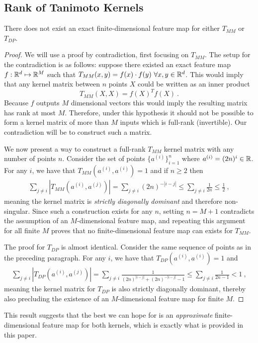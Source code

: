 \subsection{Rank of Tanimoto Kernels}\label{apdx:proof-of-kernel-rank}

\begin{lemma}
    There does not exist an exact finite-dimensional feature map for either $T_{MM}$ or $T_{DP}$.
\end{lemma}
\begin{proof}
    We will use a proof by contradiction, first focusing on $T_{MM}$.
    The setup for the contradiction is as follows: suppose there existed an exact feature map
    $f:\mathbb{R}^d\mapsto\mathbb{R}^M$
    such that $T_{MM}(x,y)=f(x)\cdot f(y)\ \forall x,y\in\mathbb{R}^d$.
    This would imply that any kernel matrix between $n$ points $X$
    could be written as an inner product
    \begin{equation*}
        T_{MM}(X,X)=f(X)^T f(X) \ .
    \end{equation*}
    Because $f$ outputs $M$ dimensional vectors this would imply the resulting matrix has rank at most $M$.
    Therefore, under this hypothesis it should not be possible to form a kernel matrix of more than $M$ inputs which is full-rank (invertible). Our contradiction will be to construct such a matrix.

    We now present a way to construct a full-rank $T_{MM}$ kernel matrix with any number of points $n$.
    Consider the set of points $\{a^{(i)}\}_{i=1}^n$ where $a^{(i)}= (2n)^i \in \mathbb{R}$.
    For any $i$, we have that $T_{MM}(a^{(i)}, a^{(i)})=1$
    and if $n\geq 2$ then
    \begin{align*}
        \sum_{j\neq i} | T_{MM}(a^{(i)}, a^{(j)}) | = \sum_{j\neq i} (2n)^{-|i-j|} \leq \sum_{j\neq i} \frac{1}{2n} \leq \frac{1}{2}\ ,
    \end{align*}
    meaning the kernel matrix is \emph{strictly diagonally dominant} and therefore non-singular.
    Since such a construction exists for any $n$,
    setting $n=M+1$ contradicts the assumption of an $M$-dimensional feature map, and repeating this argument for all finite $M$ proves that no finite-dimensional feature map can exists for $T_{MM}$.

    The proof for $T_{DP}$ is almost identical.
    Consider the same sequence of points as in the preceding paragraph.
    For any $i$, we have that $T_{DP}(a^{(i)}, a^{(i)})=1$ and
    \begin{align*}
        \sum_{j\neq i} | T_{DP}(a^{(i)}, a^{(j)}) | = \sum_{j\neq i} \frac{1}{(2n)^{|i-j|} + (2n)^{-|i-j|} - 1} \leq \sum_{j\neq i} \frac{1}{2n-1} < 1\ ,
    \end{align*}
    meaning the kernel matrix for $T_{DP}$ is also strictly diagonally dominant,
    thereby also precluding the existence of an $M$-dimensional feature map for finite $M$.


\end{proof}

This result suggests that the best we can hope for is an \emph{approximate} finite-dimensional feature map for both kernels,
which is exactly what is provided in this paper.